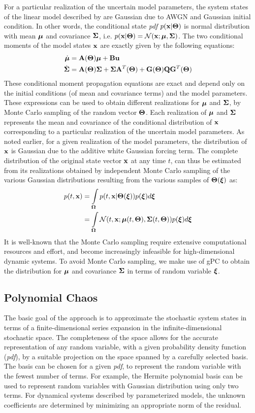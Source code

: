 \documentclass[10pt, conference]{IEEEtran}
\begin{document}
For a particular realization of the uncertain model parameters, the system states of the linear model described by  are Gaussian due to AWGN and Gaussian initial condition. In other words, the conditional state \textit{pdf} $p(\mathbf{x}|\boldsymbol{\Theta})$ is normal distribution with mean $\boldsymbol{\mu}$ and covariance $\boldsymbol{\Sigma}$, i.e. $p(\mathbf{x}|\boldsymbol{\Theta})=\mathcal{N}(\mathbf{x};\boldsymbol{\mu},\boldsymbol{\Sigma})$. The two conditional moments of the model states $\mathbf{x}$ are exactly given by the following equations: \begin{align}\label{meanG}
\dot{\boldsymbol{\mu}} &=\mathbf{A}(\boldsymbol{\Theta})\boldsymbol{\mu} + \mathbf{B}\mathbf{u}\\
\dot{\boldsymbol{\Sigma}} &= \mathbf{A}(\boldsymbol{\Theta})\boldsymbol{\Sigma}+\boldsymbol{\Sigma}\mathbf{A}^T(\boldsymbol{\Theta})+\mathbf{G}(\boldsymbol{\Theta}) \mathbf{Q} \mathbf{G}^T(\boldsymbol{\Theta}) \label{covG}
\end{align}
These conditional moment propagation equations are exact and depend only on the initial conditions (of mean and covariance terms) and the model parameters. These expressions can be used to obtain different realizations for $\boldsymbol{\mu}$ and $\boldsymbol{\Sigma}$, by Monte Carlo sampling of the random vector $\boldsymbol{\Theta}$. Each realization of $\boldsymbol{\mu}$ and $\boldsymbol{\Sigma}$ represents the mean and covariance of the conditional distribution of $\mathbf{x}$ corresponding to a particular realization of the uncertain model parameters. As noted earlier, for a given realization of the model parameters, the distribution of $\mathbf{x}$ is Gaussian due to the additive white Gaussian forcing term. The complete distribution of the original state vector $\mathbf{x}$ at any time $t$, can thus be estimated from its realizations obtained by independent Monte Carlo sampling of the various Gaussian distributions resulting from the various samples of $\boldsymbol{\Theta}(\boldsymbol{\xi})$ as:
\begin{align}
p(t,\mathbf{x}) &= \int\limits_{\boldsymbol{\Omega}}{p(t,\mathbf{x}|\boldsymbol{\Theta}(\boldsymbol{\xi}))p(\boldsymbol{\xi})d\boldsymbol{\xi}}\\
&=\int\limits_{\boldsymbol{\Omega}}\mathcal{N}(t,\mathbf{x};\boldsymbol{\mu}(t,\boldsymbol{\Theta}),\boldsymbol{\Sigma}(t,\boldsymbol{\Theta}))p(\boldsymbol{\xi})d\boldsymbol{\xi} \label{meth2pi}
\end{align}
It is well-known that the Monte Carlo sampling require extensive computational resources and effort, and become increasingly infeasible for high-dimensional dynamic systems\cite{DaumCurse}. To avoid Monte Carlo sampling, we make use of gPC to obtain the distribution for $\boldsymbol{\mu}$ and covariance $\boldsymbol{\Sigma}$ in terms of random variable $\boldsymbol{\xi}$.
\subsection{Polynomial Chaos}
The basic goal of the approach is to approximate the stochastic system states in terms of a finite-dimensional series expansion in the infinite-dimensional stochastic space. The completeness of the space allows for the accurate representation of any random variable, with a given probability density function (\textit{pdf}), by a suitable projection on the space spanned by a carefully selected basis. The basis can be chosen for a given \textit{pdf}, to represent the random variable with the fewest number of terms. For example, the Hermite polynomial basis can be used to represent random variables with Gaussian distribution using only two terms. For dynamical systems described by parameterized models, the unknown coefficients are determined by minimizing an appropriate norm of the residual.
\end{document}
